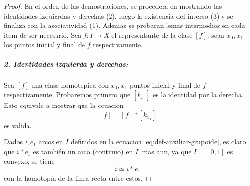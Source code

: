 \begin{proof}
En el orden de las demostraciones, se procedera en mostrando las
identidades izquierdas y derechas (2), luego la existencia del inverso
(3) y se finaliza con la asociatividad (1). Ademas se probaran lemas
intermedios en cada item de ser necesario. Sea \(f : I
\to X\) el representante de la clase \([f]\). sean \(x_0, x_1\) los
puntos inicial y final de \(f\) respectivamente.

\subparagraph{2. Identidades izquierda y derechas:} Sea \([f]\) una clase
homotopica con \(x_0, x_1\) puntos inicial y final de \(f\)
respectivamente. Probaremos primero que \([k_{x_1}]\) es la identidad
por la derecha. Esto equivale a mostrar que la ecuacion
\[ [f] = [f] * [k_{x_1}]\]
es valida.

Dados \(i,e_1\) arcos en \(I\) definidos en la
ecuacion \eqref{eq:def-auxiliar-grupoide},
es claro que \(i * e_1\) es también un arco (continuo) en \(I\); mas aun,
ya que \(I = [0,1]\) es convexo, se tiene
\begin{equation}
i \simeq i * e_1 \label{eq:ident-homotopy}
\end{equation}
con la homotopía de la linea recta entre estos.


\end{proof}
